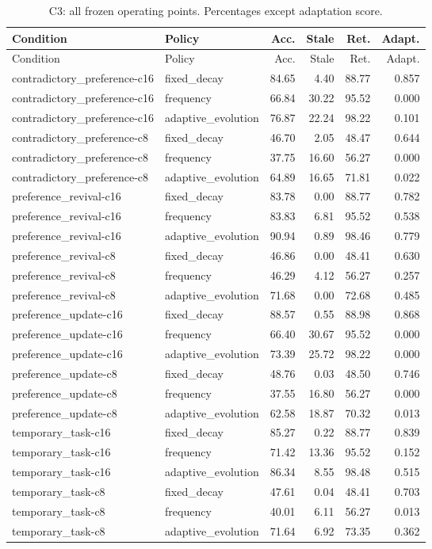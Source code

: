 \begin{longtable}{llrrrr}\caption{C3: all frozen operating points. Percentages except adaptation score.}\label{tab:C3}\\\toprule Condition & Policy & Acc. & Stale & Ret. & Adapt.\\\midrule\endfirsthead\toprule Condition & Policy & Acc. & Stale & Ret. & Adapt.\\\midrule\endhead
contradictory\_preference-c16 & fixed\_decay & 84.65 & 4.40 & 88.77 & 0.857\\
contradictory\_preference-c16 & frequency & 66.84 & 30.22 & 95.52 & 0.000\\
contradictory\_preference-c16 & adaptive\_evolution & 76.87 & 22.24 & 98.22 & 0.101\\
contradictory\_preference-c8 & fixed\_decay & 46.70 & 2.05 & 48.47 & 0.644\\
contradictory\_preference-c8 & frequency & 37.75 & 16.60 & 56.27 & 0.000\\
contradictory\_preference-c8 & adaptive\_evolution & 64.89 & 16.65 & 71.81 & 0.022\\
preference\_revival-c16 & fixed\_decay & 83.78 & 0.00 & 88.77 & 0.782\\
preference\_revival-c16 & frequency & 83.83 & 6.81 & 95.52 & 0.538\\
preference\_revival-c16 & adaptive\_evolution & 90.94 & 0.89 & 98.46 & 0.779\\
preference\_revival-c8 & fixed\_decay & 46.86 & 0.00 & 48.41 & 0.630\\
preference\_revival-c8 & frequency & 46.29 & 4.12 & 56.27 & 0.257\\
preference\_revival-c8 & adaptive\_evolution & 71.68 & 0.00 & 72.68 & 0.485\\
preference\_update-c16 & fixed\_decay & 88.57 & 0.55 & 88.98 & 0.868\\
preference\_update-c16 & frequency & 66.40 & 30.67 & 95.52 & 0.000\\
preference\_update-c16 & adaptive\_evolution & 73.39 & 25.72 & 98.22 & 0.000\\
preference\_update-c8 & fixed\_decay & 48.76 & 0.03 & 48.50 & 0.746\\
preference\_update-c8 & frequency & 37.55 & 16.80 & 56.27 & 0.000\\
preference\_update-c8 & adaptive\_evolution & 62.58 & 18.87 & 70.32 & 0.013\\
temporary\_task-c16 & fixed\_decay & 85.27 & 0.22 & 88.77 & 0.839\\
temporary\_task-c16 & frequency & 71.42 & 13.36 & 95.52 & 0.152\\
temporary\_task-c16 & adaptive\_evolution & 86.34 & 8.55 & 98.48 & 0.515\\
temporary\_task-c8 & fixed\_decay & 47.61 & 0.04 & 48.41 & 0.703\\
temporary\_task-c8 & frequency & 40.01 & 6.11 & 56.27 & 0.013\\
temporary\_task-c8 & adaptive\_evolution & 71.64 & 6.92 & 73.35 & 0.362\\
\bottomrule\end{longtable}